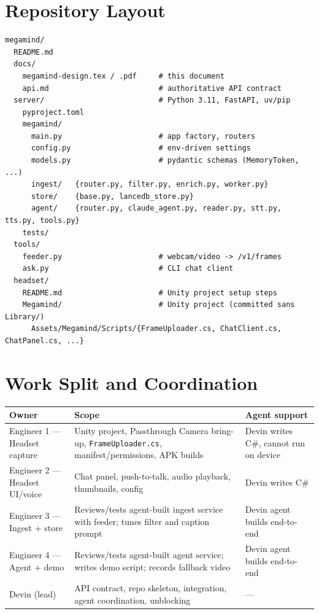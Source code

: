 \documentclass[11pt,a4paper]{article}
\begin{document}
\section{Repository Layout}
\begin{lstlisting}
megamind/
  README.md
  docs/
    megamind-design.tex / .pdf     # this document
    api.md                         # authoritative API contract
  server/                          # Python 3.11, FastAPI, uv/pip
    pyproject.toml
    megamind/
      main.py                      # app factory, routers
      config.py                    # env-driven settings
      models.py                    # pydantic schemas (MemoryToken, ...)
      ingest/   {router.py, filter.py, enrich.py, worker.py}
      store/    {base.py, lancedb_store.py}
      agent/    {router.py, claude_agent.py, reader.py, stt.py, tts.py, tools.py}
    tests/
  tools/
    feeder.py                      # webcam/video -> /v1/frames
    ask.py                         # CLI chat client
  headset/
    README.md                      # Unity project setup steps
    Megamind/                      # Unity project (committed sans Library/)
      Assets/Megamind/Scripts/{FrameUploader.cs, ChatClient.cs, ChatPanel.cs, ...}
\end{lstlisting}

\section{Work Split and Coordination}

\begin{center}
\begin{tabular}{P{0.22\textwidth}P{0.48\textwidth}P{0.24\textwidth}}
\toprule
\textbf{Owner} & \textbf{Scope} & \textbf{Agent support} \\
\midrule
Engineer 1 --- Headset capture & Unity project, Passthrough Camera bring-up, \texttt{FrameUploader.cs}, manifest/permissions, APK builds & Devin writes C\#, cannot run on device \\
Engineer 2 --- Headset UI/voice & Chat panel, push-to-talk, audio playback, thumbnails, config & Devin writes C\# \\
Engineer 3 --- Ingest + store & Reviews/tests agent-built ingest service with feeder; tunes filter and caption prompt & Devin agent builds end-to-end \\
Engineer 4 --- Agent + demo & Reviews/tests agent-built agent service; writes demo script; records fallback video & Devin agent builds end-to-end \\
Devin (lead) & API contract, repo skeleton, integration, agent coordination, unblocking & --- \\
\bottomrule
\end{tabular}
\end{center}
\end{document}
